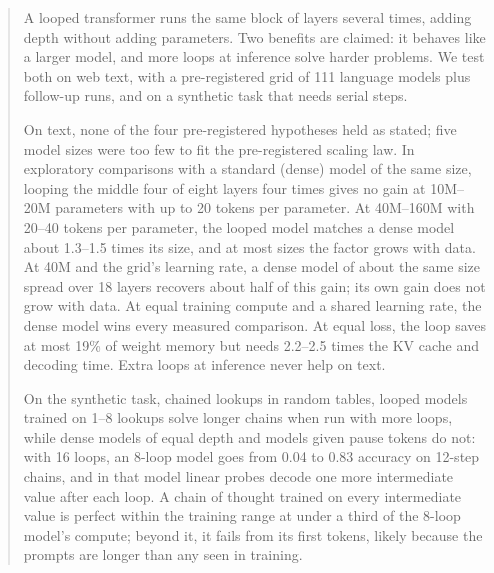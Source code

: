 \begin{abstract}
A looped transformer runs the same block of layers several times, adding depth without adding parameters. Two benefits
are claimed: it behaves like a larger model, and more loops at inference solve harder problems. We test both on web
text, with a pre-registered grid of 111 language models plus follow-up runs, and on a synthetic task that needs serial
steps.

On text, none of the four pre-registered hypotheses held as stated; five model sizes were too few to fit the
pre-registered scaling law. In exploratory comparisons with a standard (dense) model of the same size, looping the
middle four of eight layers four times gives no gain at 10M--20M parameters with up to 20 tokens per parameter.
At 40M--160M with 20--40 tokens per parameter, the looped model matches a dense model about 1.3--1.5 times its size,
and at most sizes the factor grows with data. At 40M and the grid's learning rate, a dense model of about the same size spread over 18 layers recovers about half of this gain; its own gain does not grow with data. At equal training compute and a shared learning rate, the dense model wins every measured comparison. At
equal loss, the loop saves at most 19\% of weight memory but needs 2.2--2.5 times the KV cache and decoding time. Extra
loops at inference never help on text.

On the synthetic task, chained lookups in random tables, looped models trained on 1--8 lookups solve longer chains
when run with more loops, while dense models of equal depth and models given pause tokens do not: with 16 loops, an
8-loop model goes from 0.04 to 0.83 accuracy on 12-step chains, and in that model
linear probes decode one more intermediate value after each loop. A chain of thought trained on every intermediate value is perfect within the training range at under a third of the
8-loop model's compute; beyond it, it fails from its first tokens, likely because the prompts are longer than any seen
in training.
\end{abstract}
